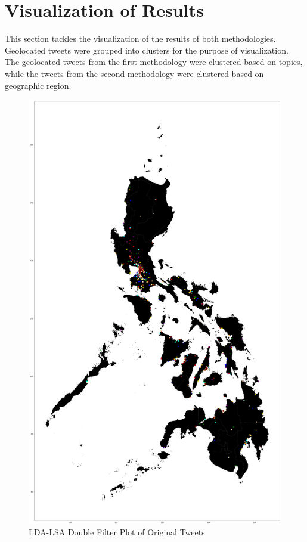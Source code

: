 \section{Visualization of Results}
This section tackles the visualization of the results of both methodologies. Geolocated tweets were grouped into clusters for the purpose of visualization. The geolocated tweets from the first methodology were clustered based on topics, while the tweets from the second methodology were clustered based on geographic region. 


\begin{figure}
    \centering
    \includegraphics[width=\textwidth, height=\textheight,keepaspectratio]{Method1OrigMap.png}
    \caption{LDA-LSA Double Filter Plot of Original Tweets}
    \label{fig:my_label1}
\end{figure}

